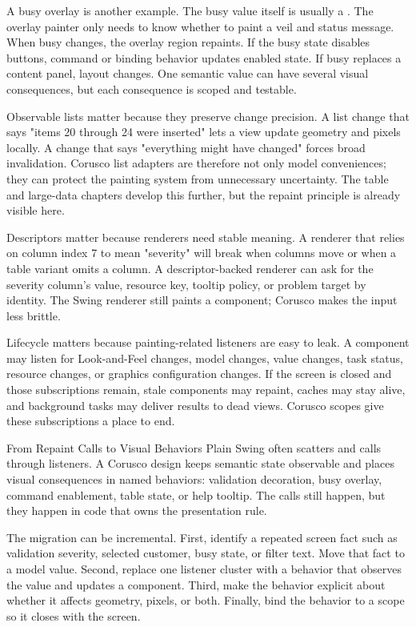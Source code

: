 A busy overlay is another example. The busy value itself is usually a . The overlay painter only needs to know whether to paint a veil and status message. When busy changes, the overlay region repaints. If the busy state disables buttons, command or binding behavior updates enabled state. If busy replaces a content panel, layout changes. One semantic value can have several visual consequences, but each consequence is scoped and testable.

Observable lists matter because they preserve change precision. A list change that says "items 20 through 24 were inserted" lets a view update geometry and pixels locally. A change that says "everything might have changed" forces broad invalidation. Corusco list adapters are therefore not only model conveniences; they can protect the painting system from unnecessary uncertainty. The table and large-data chapters develop this further, but the repaint principle is already visible here.

Descriptors matter because renderers need stable meaning. A renderer that relies on column index 7 to mean "severity" will break when columns move or when a table variant omits a column. A descriptor-backed renderer can ask for the severity column's value, resource key, tooltip policy, or problem target by identity. The Swing renderer still paints a component; Corusco makes the input less brittle.

Lifecycle matters because painting-related listeners are easy to leak. A component may listen for Look-and-Feel changes, model changes, value changes, task status, resource changes, or graphics configuration changes. If the screen is closed and those subscriptions remain, stale components may repaint, caches may stay alive, and background tasks may deliver results to dead views. Corusco scopes give these subscriptions a place to end.

\begin{migrationbox}{From Repaint Calls to Visual Behaviors}
Plain Swing often scatters  and  calls through listeners. A Corusco design keeps semantic state observable and places visual consequences in named behaviors: validation decoration, busy overlay, command enablement, table state, or help tooltip. The calls still happen, but they happen in code that owns the presentation rule.
\end{migrationbox}

The migration can be incremental. First, identify a repeated screen fact such as validation severity, selected customer, busy state, or filter text. Move that fact to a model value. Second, replace one listener cluster with a behavior that observes the value and updates a component. Third, make the behavior explicit about whether it affects geometry, pixels, or both. Finally, bind the behavior to a scope so it closes with the screen.

